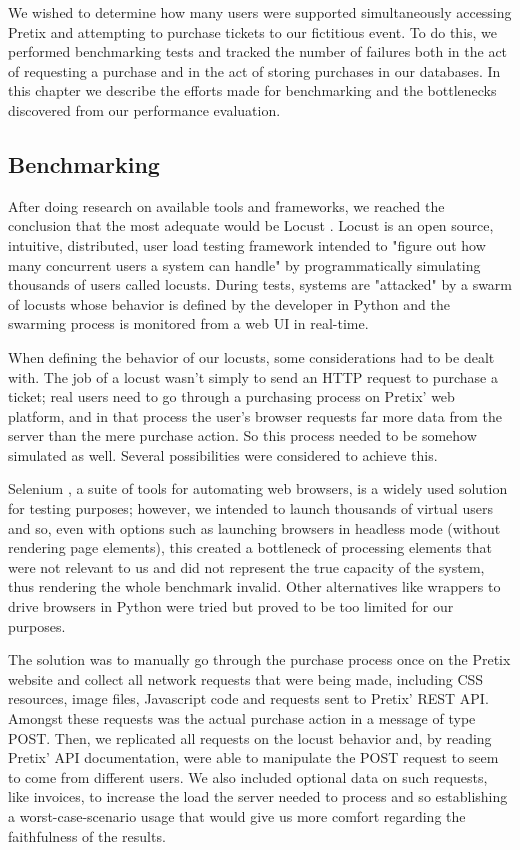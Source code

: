 \documentclass[12pt]{article}
\begin{document}
We wished to determine how many users were supported simultaneously accessing Pretix and attempting to purchase tickets to our fictitious event.
To do this, we performed benchmarking tests and tracked the number of failures both in the act of requesting a purchase and in the act of storing purchases in 
our databases.
In this chapter we describe the efforts made for benchmarking and the bottlenecks discovered from our performance evaluation.

\subsection{Benchmarking} \label{performance.benchmarking} %


After doing research on available tools and frameworks, we reached the conclusion that the most adequate would be Locust \cite{locust}.
Locust is an open source, intuitive, distributed, user load testing framework intended to "figure out how many concurrent users a system can handle" by 
programmatically simulating thousands of users called locusts.
During tests, systems are "attacked" by a swarm of locusts whose behavior is defined by the developer in Python and the swarming process is monitored from a 
web UI in real-time. 

When defining the behavior of our locusts, some considerations had to be dealt with.
The job of a locust wasn't simply to send an HTTP request to purchase a ticket; real users need to go through a purchasing process on Pretix' web platform, and 
in that process the user's browser requests far more data from the server than the mere purchase action.
So this process needed to be somehow simulated as well.
Several possibilities were considered to achieve this.

Selenium \cite{selenium}, a suite of tools for automating web browsers, is a widely used solution for testing purposes; however, we intended to launch thousands 
of virtual users and so, even with options such as launching browsers in headless mode (without rendering page elements), this created a bottleneck of processing 
elements that were not relevant to us and did not represent the true capacity of the system, thus rendering the whole benchmark invalid.
Other alternatives like wrappers to drive browsers in Python were tried but proved to be too limited for our purposes.

The solution was to manually go through the purchase process once on the Pretix website and collect all network requests that were being made, including CSS 
resources, image files, Javascript code and requests sent to Pretix' REST API.
Amongst these requests was the actual purchase action in a message of type POST.
Then, we replicated all requests on the locust behavior and, by reading Pretix' API documentation, were able to manipulate the POST request to seem to come 
from different users.
We also included optional data on such requests, like invoices, to increase the load the server needed to process and so establishing a worst-case-scenario usage 
that would give us more comfort regarding the faithfulness of the results.
\end{document}
